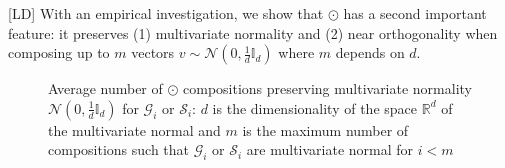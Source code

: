 \documentclass[twoside,11pt]{article}
\def\vec#1{\mathbf{#1}}
\def\smallvectors#1{\mathcal{#1}}
\def\R{\mathbb{R}}
\def\shuf#1#2{t_{#1}(#2)}
\def\mo{\odot}
\def\LD#1{[{\color{blue}L}D] {\color{blue}#1}}
\begin{document}

\LD{With an empirical investigation, we show that $\mo$ has a second important feature: it preserves (1) multivariate normality and (2) near orthogonality when composing up to $m$ vectors $v \sim \mathcal{N}(0,\frac{1}{d}\mathbb{I}_d)$ where $m$ depends on $d$.}

\begin{figure}
\begin{center}
\end{center}
\caption{Average number of $\mo$ compositions preserving multivariate normality  $\mathcal{N}(0,\frac{1}{d}\mathbb{I}_d)$ for $\smallvectors{G}_i$ or $\smallvectors{S}_i$: $d$ is the dimensionality of the space $\R^d$ of the multivariate normal and $m$ is the maximum number of compositions such that $\smallvectors{G}_i$ or $\smallvectors{S}_i$  are  multivariate normal for $i<m$}
\label{fig:cc_property}
\end{figure}
\end{document}
